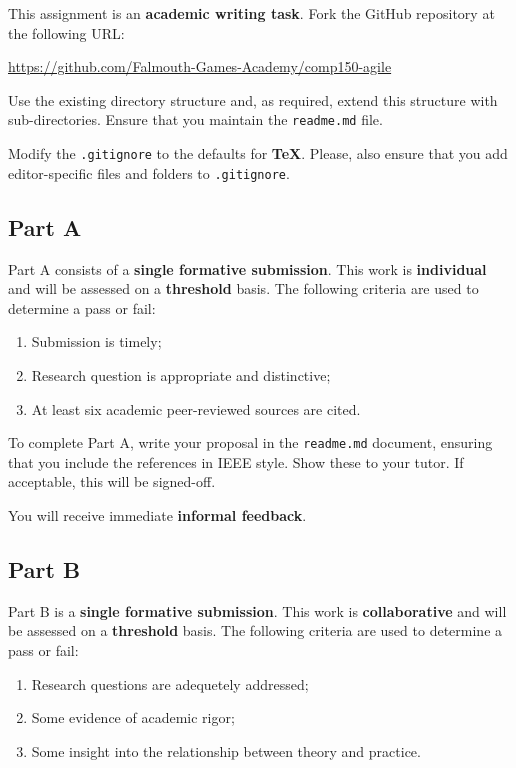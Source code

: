 \documentclass{../fal_assignment}
\begin{document}
This assignment is an \textbf{academic writing task}. Fork the GitHub repository at the following URL:

\indent \url{https://github.com/Falmouth-Games-Academy/comp150-agile}

Use the existing directory structure and, as required, extend this structure with sub-directories. Ensure that you maintain the \texttt{readme.md} file.

Modify the \texttt{.gitignore} to the defaults for \textbf{TeX}. Please, also ensure that you add editor-specific files and folders to \texttt{.gitignore}. 

\subsection*{Part A}

Part A consists of a \textbf{single formative submission}. This work is \textbf{individual} and will be assessed on a \textbf{threshold} basis. The following criteria are used to determine a pass or fail:

\begin{enumerate}[label=(\alph*)]
	\item Submission is timely;
	\item Research question is appropriate and distinctive;
	\item At least six academic peer-reviewed sources are cited.
\end{enumerate}

To complete Part A, write your proposal in the \texttt{readme.md} document, ensuring that you include the references in IEEE style.  Show these to your tutor.  If acceptable, this will be signed-off. 

You will receive immediate \textbf{informal feedback}.

\subsection*{Part B}

Part B is a \textbf{single formative submission}. This work is \textbf{collaborative} and will be assessed on a \textbf{threshold} basis. The following criteria are used to determine a pass or fail:

\begin{enumerate}[label=(\alph*)]
	\item Research questions are adequetely addressed;
	\item Some evidence of academic rigor;
	\item Some insight into the relationship between theory and practice.
\end{enumerate}
\end{document}
